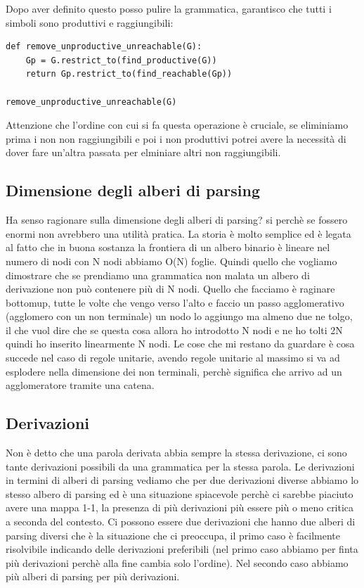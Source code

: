 Dopo aver definito questo posso pulire la grammatica, garantisco che tutti i simboli sono produttivi e raggiungibili:
\begin{lstlisting}
def remove_unproductive_unreachable(G):
    Gp = G.restrict_to(find_productive(G))
    return Gp.restrict_to(find_reachable(Gp))

remove_unproductive_unreachable(G)
\end{lstlisting}

Attenzione che l'ordine con cui si fa questa operazione è cruciale, se eliminiamo prima i non non raggiungibili e poi i non produttivi potrei avere la necessità di dover fare un'altra passata per elminiare altri non raggiungibili.

\subsection{Dimensione degli alberi di parsing}
Ha senso ragionare sulla dimensione degli alberi di parsing? si perchè se fossero enormi non avrebbero una utilità pratica. La storia è molto semplice ed è legata al fatto che in buona sostanza la frontiera di un albero binario è lineare nel numero di nodi con N nodi abbiamo O(N) foglie. Quindi quello che vogliamo dimostrare che se prendiamo una grammatica non malata un albero di derivazione non può contenere più di N nodi.
Quello che facciamo è raginare bottomup, tutte le volte che vengo verso l'alto e faccio un passo agglomerativo (agglomero con un non terminale) un nodo lo aggiungo ma almeno due ne tolgo, il che vuol dire che se questa cosa allora ho introdotto N nodi e ne ho tolti 2N quindi ho inserito linearmente N nodi. Le cose che mi restano da guardare è cosa succede nel caso di regole unitarie, avendo regole unitarie al massimo si va ad esplodere nella dimensione dei non terminali, perchè significa che arrivo ad un agglomeratore tramite una catena.

\subsection{Derivazioni}
Non è detto che una parola derivata abbia sempre la stessa derivazione, ci sono tante derivazioni possibili da una grammatica per la stessa parola. Le derivazioni in termini di alberi di parsing vediamo che per due derivazioni diverse abbiamo lo stesso albero di parsing ed è una situazione spiacevole perchè ci sarebbe piaciuto avere una mappa 1-1, la presenza di più derivazioni più essere più o meno critica a seconda del contesto. Ci possono essere due derivazioni che hanno due alberi di parsing diversi che è la situazione che ci preoccupa, il primo caso è facilmente risolvibile indicando delle derivazioni preferibili (nel primo caso abbiamo per finta più derivazioni perchè alla fine cambia solo l'ordine).
Nel secondo caso abbiamo più alberi di parsing per più derivazioni.

